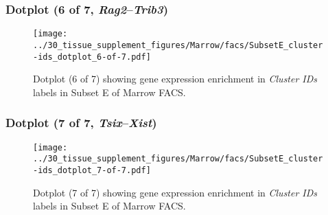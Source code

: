 \clearpage

\subsubsection{Dotplot (6 of 7, \emph{Rag2}--\emph{Trib3})}
\begin{figure}[h]
\centering
\texttt{[image: ../30\_tissue\_supplement\_figures/Marrow/facs/SubsetE\_cluster-ids\_dotplot\_6-of-7.pdf]}

\caption{ Dotplot (6 of 7)  showing gene expression enrichment in \emph{Cluster IDs} labels in Subset E of Marrow FACS. }
\end{figure}


\clearpage

\subsubsection{Dotplot (7 of 7, \emph{Tsix}--\emph{Xist})}
\begin{figure}[h]
\centering
\texttt{[image: ../30\_tissue\_supplement\_figures/Marrow/facs/SubsetE\_cluster-ids\_dotplot\_7-of-7.pdf]}

\caption{ Dotplot (7 of 7)  showing gene expression enrichment in \emph{Cluster IDs} labels in Subset E of Marrow FACS. }
\end{figure}

